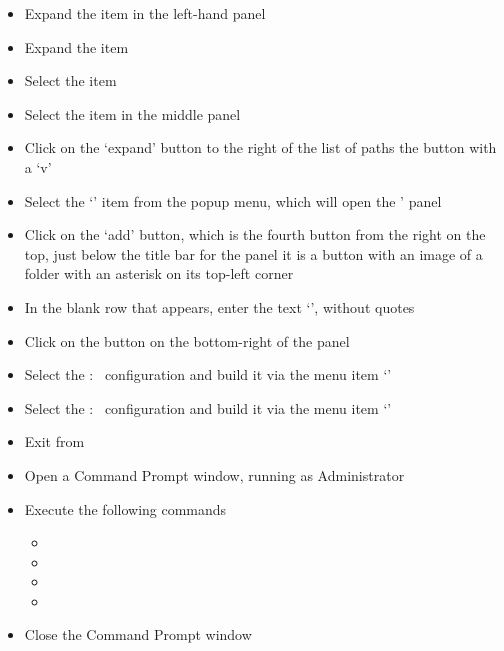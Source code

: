 \begin{itemize}
\item\exSp{}Expand the  item in the left-hand panel
\item\exSp{}Expand the  item
\item\exSp{}Select the  item
\item\exSp{}Select the  item in the middle panel
\item\exSp{}Click on the `expand' button to the right of the list of paths \longDash{} the
button with a `v'
\item\exSp{}Select the `' item from the popup menu, which
will open the ' panel
\item\exSp{}Click on the `add' button, which is the fourth button from the right on the
top, just below the title bar for the panel \longDash{} it is a button with an image of a
folder with an asterisk on its top-left corner
\item\exSp{}In the blank row that appears, enter the text
`',
without quotes
\item\exSp{}Click on the  button on the bottom-right of the panel
\item\exSp{}Select the  :\  configuration and build it via
the menu item `'
\item\exSp{}Select the  :\  configuration and build it via
the menu item `'
\item\exSp{}Exit from 
\item\exSp{}Open a Command Prompt window, running as Administrator
\item\exSp{}Execute the following commands
\begin{itemize}
\item{}
\item\exSp{}
\item\exSp{}
\item\exSp{}
\end{itemize}
\item\exSp{}Close the Command Prompt window
\end{itemize}
